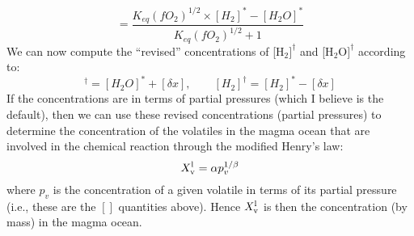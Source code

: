 \begin{equation}
[\delta x] = \frac{K_{eq} (fO_2)^{1/2} \times [H_2]^\ast - [H_2O]^\ast }{K_{eq} (fO_2)^{1/2} + 1}
\label{eq:Keq_diff_solve}
\end{equation}
We can now compute the ``revised'' concentrations of [H$_2]^\dagger$ and [H$_2$O$]^\dagger$ according to:
\begin{equation}
[H_2O]^\dagger = [H_2O]^\ast + [\delta x], \qquad [H_2]^\dagger = [H_2]^\ast - [\delta x]
\end{equation}
If the concentrations are in terms of partial pressures (which I believe is the default), then we can use these revised concentrations (partial pressures) to determine the concentration of the volatiles in the magma ocean that are involved in the chemical reaction through the modified Henry's law:
\begin{equation}
X_{\rm v}^{\rm l} = \alpha p_v^{1/\beta} %
\label{eq:Henry_mod_invert}
\end{equation}
where $p_v$ is the concentration of a given volatile in terms of its partial pressure (i.e., these are the $[]$ quantities above).  Hence $X_{\rm v}^{\rm l}$ is then the concentration (by mass) in the magma ocean.  
